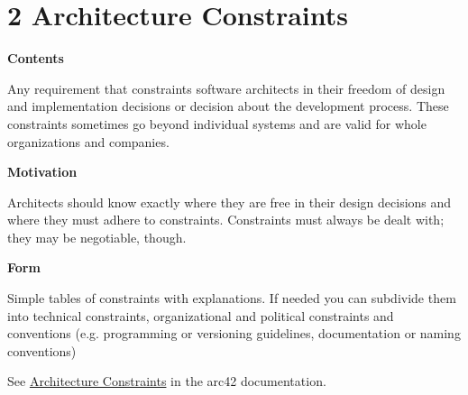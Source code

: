 \hypertarget{section-architecture-constraints}{%
\section{2 Architecture Constraints}\label{section-architecture-constraints}}

\textbf{Contents}

Any requirement that constraints software architects in their freedom of
design and implementation decisions or decision about the development
process. These constraints sometimes go beyond individual systems and
are valid for whole organizations and companies.

\textbf{Motivation}

Architects should know exactly where they are free in their design
decisions and where they must adhere to constraints. Constraints must
always be dealt with; they may be negotiable, though.

\textbf{Form}

Simple tables of constraints with explanations. If needed you can
subdivide them into technical constraints, organizational and political
constraints and conventions (e.g. programming or versioning guidelines,
documentation or naming conventions)

See \href{https://docs.arc42.org/section-2/}{Architecture Constraints}
in the arc42 documentation.
